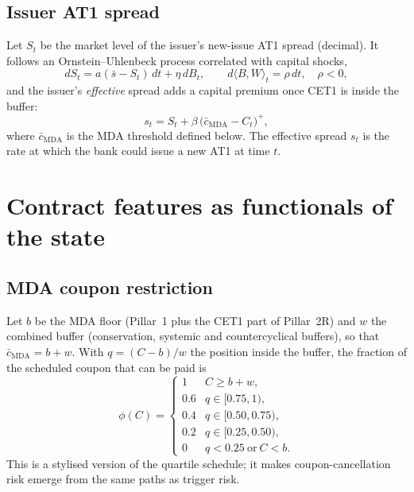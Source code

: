 \documentclass[11pt]{article}
\newcommand{\1}{\mathbf{1}}
\newcommand{\bmda}{\bar c_{\mathrm{MDA}}}
\begin{document}
\subsection{Issuer AT1 spread}
Let $S_t$ be the market level of the issuer's new-issue AT1 spread (decimal).
It follows an Ornstein--Uhlenbeck process correlated with capital shocks,
\begin{equation}\label{eq:spread}
  dS_t = a(\bar s - S_t)\,dt + \eta\,dB_t,\qquad
  d\langle B, W\rangle_t = \rho\,dt,\quad \rho<0,
\end{equation}
and the issuer's \emph{effective} spread adds a capital premium once CET1 is
inside the buffer:
\begin{equation}\label{eq:seff}
  s_t = S_t + \beta\,\bigl(\bmda - C_t\bigr)^+ ,
\end{equation}
where $\bmda$ is the MDA threshold defined below. The effective spread $s_t$ is
the rate at which the bank could issue a new AT1 at time $t$.

\section{Contract features as functionals of the state}

\subsection{MDA coupon restriction}
Let $b$ be the MDA floor (Pillar~1 plus the CET1 part of Pillar~2R) and $w$ the
combined buffer (conservation, systemic and countercyclical buffers), so that
$\bmda=b+w$. With $q=(C-b)/w$ the position inside the buffer, the fraction of
the scheduled coupon that can be paid is
\begin{equation}\label{eq:mda}
  \phi(C)=
  \begin{cases}
    1 & C \ge b+w,\\
    0.6 & q\in[0.75,1),\\
    0.4 & q\in[0.50,0.75),\\
    0.2 & q\in[0.25,0.50),\\
    0 & q<0.25 \ \text{or}\ C<b.
  \end{cases}
\end{equation}
This is a stylised version of the quartile schedule; it makes
coupon-cancellation risk emerge from the same paths as trigger risk.
\end{document}
